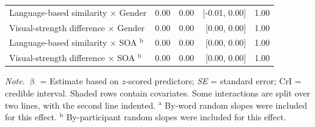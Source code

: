 \documentclass[
  12pt,
  man,floatsintext]{apa7}
\begin{document}
\begin{table}[!h]
\begin{threeparttable}
\begin{tabular}[t]{lrrrr}
\hspace{1em}Language-based similarity  $\times$  Gender & 0.00 & 0.00 & {}[-0.01, 0.00] & 1.00\\
\hspace{1em}Visual-strength difference  $\times$  Gender & 0.00 & 0.00 & {}[0.00, 0.00] & 1.00\\
\hspace{1em}Language-based similarity  $\times$  SOA $^{\text{b}}$ & 0.00 & 0.00 & {}[0.00, 0.00] & 1.00\\
\hspace{1em}Visual-strength difference  $\times$  SOA $^{\text{b}}$ & 0.00 & 0.00 & {}[0.00, 0.00] & 1.00\\
\bottomrule
\end{tabular}
\begin{tablenotes}
\item \textit{\linebreak} 
\item \textit{Note}. $\upbeta$ = Estimate based on $z$-scored predictors; \textit{SE} = standard error; \linebreak \phantom{.}CrI = credible interval. Shaded rows contain covariates. Some interactions \linebreak \phantom{.}are split over two lines, with the second line indented. \linebreak \linebreak \phantom{.}$^{\text{a}}$ By-word random slopes were included for this effect. \linebreak \phantom{.}$^{\text{b}}$ By-participant random slopes were included for this effect.
\end{tablenotes}
\end{threeparttable}
\end{table}
\end{document}
